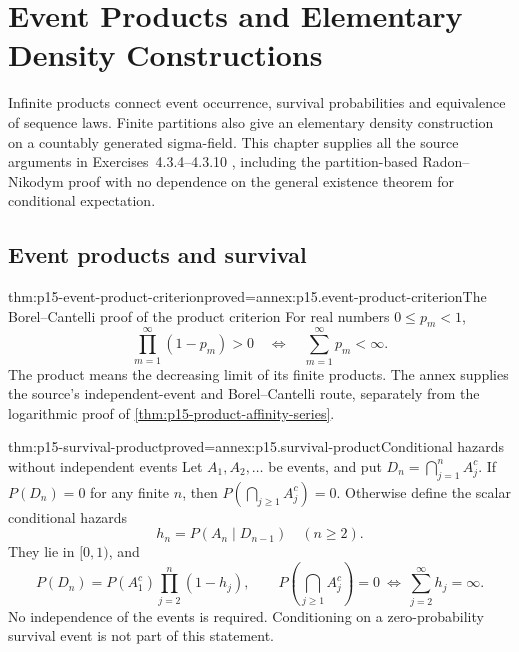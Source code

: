 \chapter{Event Products and Elementary Density Constructions}
\label{sec:p15-density-and-product-exercises}

Infinite products connect event occurrence, survival probabilities and
equivalence of sequence laws. Finite partitions also give an elementary
density construction on a countably generated sigma-field. This chapter
supplies all the source arguments in Exercises~4.3.4--4.3.10
\cite[pp.~233--234]{DurrettPTEAuthor2019}, including the
partition-based Radon--Nikodym proof with no dependence on the general
existence theorem for conditional expectation.

\section{Event products and survival}

\begin{hbtheorem}{thm:p15-event-product-criterion}{proved=annex:p15.event-product-criterion}{The Borel--Cantelli proof of the product criterion}
For real numbers \(0\leq p_m<1\),
\[
                 \prod_{m=1}^\infty(1-p_m)>0
                     \quad\Longleftrightarrow\quad
                 \sum_{m=1}^\infty p_m<\infty.
\]
The product means the decreasing limit of its finite products.
The annex supplies the source's independent-event and Borel--Cantelli
route, separately from the logarithmic proof of
\cref{thm:p15-product-affinity-series}.
\end{hbtheorem}

\begin{hbtheorem}{thm:p15-survival-product}{proved=annex:p15.survival-product}{Conditional hazards without independent events}
Let \(A_1,A_2,\ldots\) be events, and put
\(D_n=\bigcap_{j=1}^nA_j^c\).
If \(P(D_n)=0\) for any finite \(n\), then
\(P(\bigcap_{j\geq1}A_j^c)=0\).
Otherwise define the scalar conditional hazards
\[
                     h_n=P(A_n\mid D_{n-1})\quad(n\geq2).
\]
They lie in \([0,1)\), and
\[
 P(D_n)=P(A_1^c)\prod_{j=2}^n(1-h_j),\qquad
 P\!\left(\bigcap_{j\geq1}A_j^c\right)=0
             \ \Longleftrightarrow\ \sum_{j=2}^\infty h_j=\infty.
\]
No independence of the events is required. Conditioning on a
zero-probability survival event is not part of this statement.
\end{hbtheorem}

